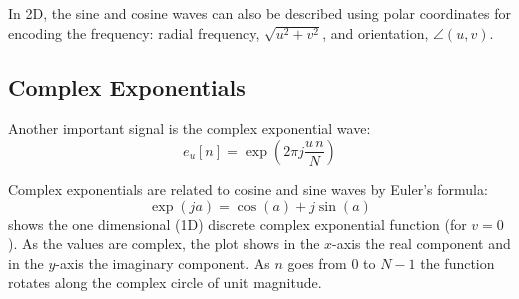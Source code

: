 In 2D, the sine and cosine waves can also be described using polar coordinates for encoding the frequency: radial frequency, $\sqrt{u^2+v^2}$, and orientation, $\angle (u,v)$. 







\subsection{Complex Exponentials}

Another important signal is the complex exponential wave: 
\begin{equation}
e_{u}\left[n\right] = \exp \left(2 \pi j   \frac{u\, n}{N}   \right) 
\end{equation}

Complex exponentials are related to cosine and sine waves by Euler's formula:
\begin{equation}
\label{eq:euler}
\exp \left(j a\right) = \cos (a) + j \sin (a)
\end{equation}
\Fig{\ref{fig:complexexponential}} shows the one dimensional (1D) discrete complex exponential function (for $v=0$). As the values are complex, the plot shows in the $x$-axis the real component and in the $y$-axis the imaginary component. As $n$ goes from 0 to $N-1$ the function rotates along the complex circle of unit magnitude.


